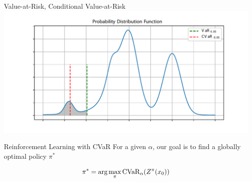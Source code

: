 \documentclass{beamer}
\begin{document}

\begin{frame}{Value-at-Risk, Conditional Value-at-Risk}
\center
\includegraphics[width=0.8\linewidth]{../gfx/pdf.pdf}

\begin{block}{Reinforcement Learning with CVaR}
For a given $\alpha$, our goal is to find a globally optimal policy $\pi^*$

$$\pi^* = \text{arg}\max_\pi \text{CVaR}_\alpha(Z^\pi(x_0))$$
\end{block}

\end{frame}


%
%
%
%
%
\end{document}
